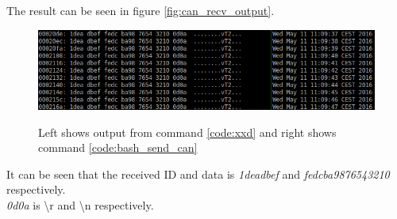 The result can be seen in figure \ref{fig:can_recv_output}.
\begin{figure}[H]
    \center
    \includegraphics[width=1\textwidth]{graphics/xdd_can_test.png}
  \label{fig:boat1}
  \caption{Left shows output from command \ref{code:xxd} and right shows command \ref{code:bash_send_can}}
\end{figure}
It can be seen that the received ID and data is \textit{1deadbef} and \textit{fedcba9876543210} respectively.\\
\textit{0d0a} is \textbackslash r and \textbackslash n respectively.


